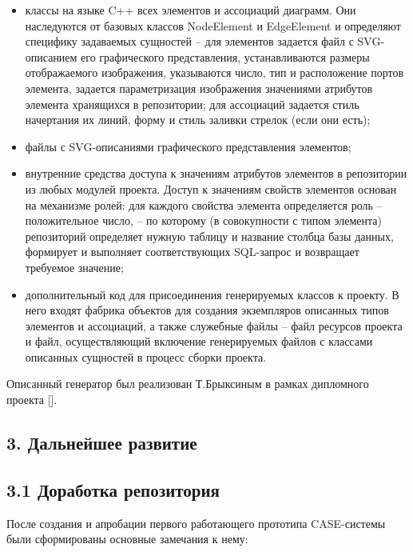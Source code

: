 \documentclass[a4paper]{article}
\newcommand\liststyleWWviiiNumiii{%
\renewcommand\theenumi{\arabic{enumi}}
\renewcommand\theenumii{\arabic{enumii}}
\renewcommand\theenumiii{\arabic{enumiii}}
\renewcommand\labelitemi{o}
\renewcommand\labelenumi{\theenumi.}
\renewcommand\labelenumii{\theenumii.}
\renewcommand\labelenumiii{\theenumiii.}
}
\begin{document}
\liststyleWWviiiNumiii
\begin{itemize}
\item {
классы на языке \foreignlanguage{english}{C}++ всех элементов и
ассоциаций диаграмм. Они наследуются от базовых классов
\foreignlanguage{english}{NodeElement} и
\foreignlanguage{english}{EdgeElement} и определяют специфику
задаваемых сущностей – для элементов задается файл с
\foreignlanguage{english}{SVG}{}-описанием его графического
представления, устанавливаются размеры отображаемого изображения,
указываются число, тип и расположение портов элемента, задается
параметризация изображения значениями атрибутов элемента хранящихся в
репозитории; для ассоциаций задается стиль начертания их линий, форму и
стиль заливки стрелок (если они есть);}
\item {
файлы с \foreignlanguage{english}{SVG}{}-описаниями графического
представления элементов;}
\item {
внутренние средства доступа к значениям атрибутов элементов в
репозитории из любых модулей проекта. Доступ к значениям свойств
элементов основан на механизме ролей: для каждого свойства элемента
определяется роль – положительное число, – по которому (в совокупности
с типом элемента) репозиторий определяет нужную таблицу и название
столбца базы данных, формирует и выполняет соответствующих
\foreignlanguage{english}{SQL}{}-запрос и возвращает требуемое
значение;}
\item {
дополнительный код для присоединения генерируемых классов к проекту. В
него входят фабрика объектов для создания экземпляров описанных типов
элементов и ассоциаций, а также служебные файлы – файл ресурсов проекта
и файл, осуществляющий включение генерируемых файлов с классами
описанных сущностей в процесс сборки проекта.}
\end{itemize}
{
Описанный генератор был реализован Т.Брыксиным в рамках дипломного
проекта [].}

\subsection{3. Дальнейшее развитие}
\subsection{3.1 Доработка репозитория}
{
После создания и апробации первого работающего прототипа
\foreignlanguage{english}{CASE}{}-системы были сформированы основные
замечания к нему:}
\end{document}
